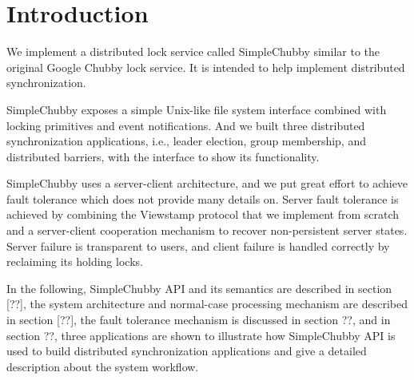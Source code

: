 \section{Introduction}

We implement a distributed lock service called SimpleChubby
similar to the original Google Chubby lock service\cite{burrows2006chubby}.
It is intended to help implement distributed synchronization.

SimpleChubby exposes a simple Unix-like file system interface
combined with locking primitives and event notifications.
And we built three distributed synchronization applications, i.e.,
leader election, group membership, and distributed barriers,
with the interface to show its functionality.

SimpleChubby uses a server-client architecture,
and we put great effort to achieve fault tolerance
which \cite{burrows2006chubby} does not provide many details on.
Server fault tolerance is achieved by combining the Viewstamp protocol
that we implement from scratch and a server-client cooperation mechanism
to recover non-persistent server states.
Server failure is transparent to users, and client failure
is handled correctly by reclaiming its holding locks.

In the following,
SimpleChubby API and its semantics are described in section [??],
the system architecture and normal-case processing mechanism
are described in section [??],
the fault tolerance mechanism is discussed in section ??,
and in section ??, 
three applications are shown to illustrate
how SimpleChubby API is used to build 
distributed synchronization applications
and give a detailed description about the system workflow.
